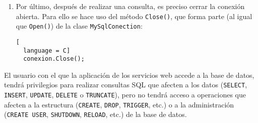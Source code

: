 \begin{enumerate}
\begin{itemize}
\begin{lstlisting}[
  language = C]
  MySqlDataReader resultado = comando.ExecuteReader();
\end{lstlisting}

\item Por otro lado, si la consulta no va a devolver ningún resultado, es
decir, si la consulta es del tipo: \texttt{INSERT}, \texttt{UPDATE},
\texttt{DELETE}, \texttt{TRUNCATE}, etc.; se utilizará el método
\texttt{ExecuteNonQuery()}:

\begin{lstlisting}[
  language = C]
  comando.ExecuteNonQuery();
\end{lstlisting}

La consulta tendrá efecto en la base de datos pero no devolverá ningún
resultado.
\end{itemize}

\item Por último, después de realizar una consulta, es preciso cerrar la
conexión abierta. Para ello se hace uso del método \texttt{Close()}, que forma
parte (al igual que \texttt{Open()}) de la clase \texttt{MySqlConection}:

\begin{lstlisting}[
  language = C]
  conexion.Close();
\end{lstlisting}
\end{enumerate}

El usuario con el que la aplicación de los servicios web accede a la base
de datos, tendrá privilegios para realizar consultas \acs{SQL} que afecten
a los datos (\texttt{SELECT}, \texttt{INSERT}, \texttt{UPDATE},
\texttt{DELETE} o \texttt{TRUNCATE}), pero no tendrá acceso a operaciones
que afecten a la estructura  (\texttt{CREATE}, \texttt{DROP}, \texttt{TRIGGER},
etc.) o a la administración (\texttt{CREATE USER}, \texttt{SHUTDOWN},
\texttt{RELOAD}, etc.) de la base de datos.

